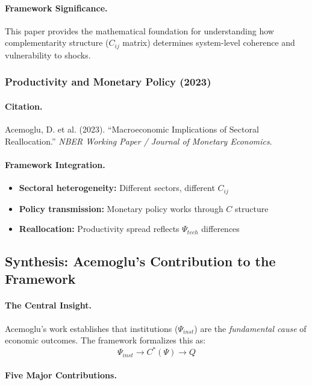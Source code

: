 \paragraph{Framework Significance.}
This paper provides the mathematical foundation for understanding
how complementarity structure ($C_{ij}$ matrix) determines system-level
coherence and vulnerability to shocks.

\subsubsection{Productivity and Monetary Policy (2023)}

\paragraph{Citation.}
Acemoglu, D. et al. (2023).
``Macroeconomic Implications of Sectoral Reallocation.''
\emph{NBER Working Paper / Journal of Monetary Economics}.

\paragraph{Framework Integration.}
\begin{itemize}
  \item \textbf{Sectoral heterogeneity:} Different sectors, different $C_{ij}$
  \item \textbf{Policy transmission:} Monetary policy works through $C$ structure
  \item \textbf{Reallocation:} Productivity spread reflects $\Psi_{tech}$ differences
\end{itemize}

\subsection{Synthesis: Acemoglu's Contribution to the Framework}

\paragraph{The Central Insight.}
Acemoglu's work establishes that institutions ($\Psi_{inst}$) are the
\emph{fundamental cause} of economic outcomes. The framework formalizes
this as:
\begin{equation}
  \Psi_{inst} \to C^*(\Psi) \to Q
\end{equation}

\paragraph{Five Major Contributions.}

